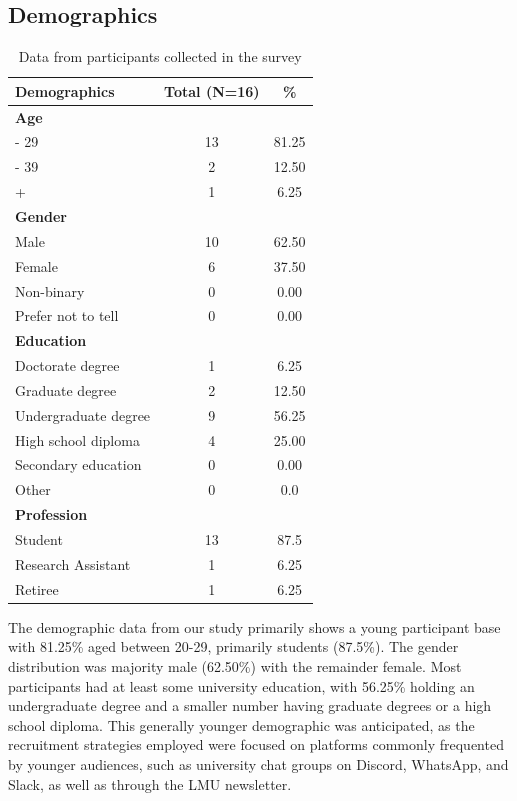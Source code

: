 \documentclass[
  a4paper,  %
  twoside,  %
  bibliography=totoc,
  headsepline,
  cleardoublepage=empty,
  parskip=half,
  draft=false
]{scrbook}
\begin{document}
\subsection{Demographics}
\begin{table}[ht]
\centering
\begin{tabularx}{\textwidth}{Xcc}
\toprule
\textbf{Demographics} & \textbf{Total (N=16)} & \textbf{\%} \\
\midrule
\textbf{Age} \\
\quad 20 - 29 & 13 & 81.25 \\
\quad 30 - 39 & 2 & 12.50 \\
\quad 40+ & 1 & 6.25 \\
\midrule
\textbf{Gender} \\
\quad Male & 10 & 62.50 \\
\quad Female & 6 & 37.50 \\
\quad Non-binary & 0 & 0.00 \\
\quad Prefer not to tell & 0 & 0.00 \\
\midrule
\textbf{Education} \\
\quad Doctorate degree & 1 & 6.25 \\
\quad Graduate degree & 2 & 12.50 \\
\quad Undergraduate degree & 9 & 56.25 \\
\quad High school diploma & 4 & 25.00 \\
\quad Secondary education & 0 & 0.00 \\
\quad Other & 0 & 0.0 \\
\midrule
\textbf{Profession} \\
\quad Student & 13 & 87.5 \\
\quad Research Assistant & 1 & 6.25 \\
\quad Retiree & 1 & 6.25 \\
\bottomrule
\end{tabularx}
\caption{Data from participants collected in the survey}
\end{table}

The demographic data from our study primarily shows a young participant base with 81.25\% aged between 20-29, primarily students (87.5\%). The gender distribution was majority male (62.50\%) with the remainder female. Most participants had at least some university education, with 56.25\% holding an undergraduate degree and a smaller number having graduate degrees or a high school diploma. This generally younger demographic was anticipated, as the recruitment strategies employed were focused on platforms commonly frequented by younger audiences, such as university chat groups on Discord, WhatsApp, and Slack, as well as through the LMU newsletter.
\end{document}

